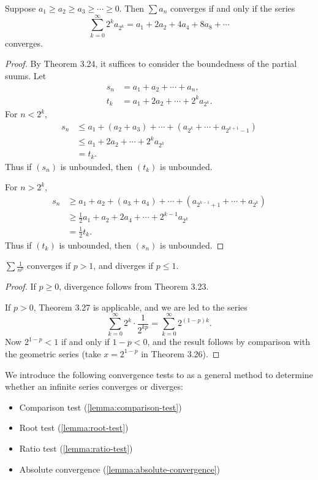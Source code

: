 \begin{lemma}
Suppose $a_1\ge a_2\ge a_3\ge\cdots\ge0$. Then $\sum a_n$ converges if and only if the series
\[\sum_{k=0}^{\infty}2^ka_{2^k}=a_1+2a_2+4a_4+8a_8+\cdots\]
converges.
\end{lemma}

\begin{proof}
By Theorem 3.24, it suffices to consider the boundedness of the partial suums. Let
\begin{align*}
s_n&=a_1+a_2+\cdots+a_n,\\
t_k&=a_1+2a_2+\cdots+2^ka_{2^k}.
\end{align*}
For $n<2^k$,
\begin{align*}
s_n&\le a_1+(a_2+a_3)+\cdots+(a_{2^k}+\cdots+a_{2^{k+1}-1})\\
&\le a_1+2a_2+\cdots+2^ka_{2^k}\\
&=t_k.
\end{align*}
Thus if $(s_n)$ is unbounded, then $(t_k)$ is unbounded.

For $n>2^k$,
\begin{align*}
s_n&\ge a_1+a_2+(a_3+a_4)+\cdots+(a_{2^{k-1}+1}+\cdots+a_{2^k})\\
&\ge\frac{1}{2}a_1+a_2+2a_4+\cdots+2^{k-1}a_{2^k}\\
&=\frac{1}{2}t_k.
\end{align*}
Thus if $(t_k)$ is unbounded, then $(s_n)$ is unbounded.
\end{proof}

\begin{lemma}[$p$-test]
$\sum\frac{1}{n^p}$ converges if $p>1$, and diverges if $p\le1$.
\end{lemma}

\begin{proof}
If $p\ge0$, divergence follows from Theorem 3.23.

If $p>0$, Theorem 3.27 is applicable, and we are led to the series
\[\sum_{k=0}^{\infty}2^k\cdot\frac{1}{2^{kp}}=\sum_{k=0}^{\infty}2^{(1-p)k}.\]
Now $2^{1-p}<1$ if and only if $1-p<0$, and the result follows by comparison with the geometric series (take $x=2^{1-p}$ in Theorem 3.26).
\end{proof}

We introduce the following convergence tests to as a general method to determine whether an infinite series converges or diverges:
\begin{itemize}
\item Comparison test (\cref{lemma:comparison-test})
\item Root test (\cref{lemma:root-test})
\item Ratio test (\cref{lemma:ratio-test})
\item Absolute convergence (\cref{lemma:absolute-convergence})
\end{itemize}

